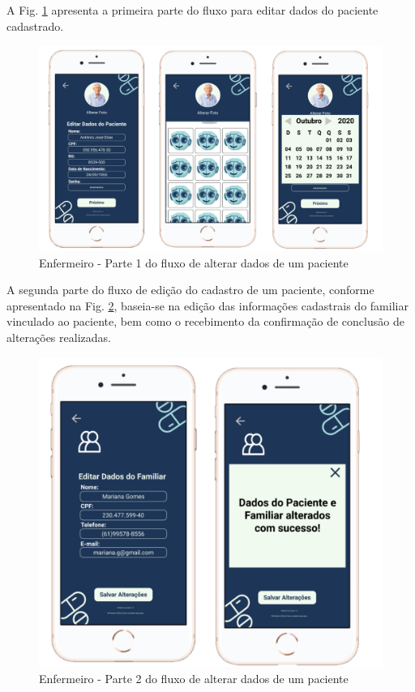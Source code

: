 A Fig. \ref{fig:prototipo_enfermeiro_alterarDadosPaciente_1} apresenta a primeira parte do fluxo para editar dados do paciente cadastrado.

\begin{figure}[H]
    \centering
    \includegraphics[width=15cm]{figuras/software/Atual_prototipo/Enfermeiro_editarDadosPaciente_1.png}
    \caption{Enfermeiro - Parte 1 do fluxo de alterar dados de um paciente}
     \label{fig:prototipo_enfermeiro_alterarDadosPaciente_1}
    
\end{figure}

A segunda parte do fluxo de edição do cadastro de um paciente, conforme apresentado na Fig. \ref{fig:prototipo_enfermeiro_alterarDadosPaciente_2}, baseia-se na edição das informações cadastrais do familiar vinculado ao paciente, bem como o recebimento da confirmação de conclusão de alterações realizadas.

\begin{figure}[H]
    \centering
    \includegraphics[width=12cm]{figuras/software/Atual_prototipo/Enfermeiro_editarDadosPaciente_2.png}
    \caption{Enfermeiro - Parte 2 do fluxo de alterar dados de um paciente}
    \label{fig:prototipo_enfermeiro_alterarDadosPaciente_2}
\end{figure}

